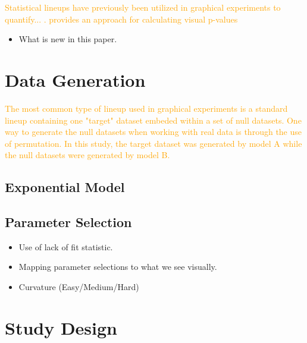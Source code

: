\documentclass[]{interact}
\theoremstyle{plain}%
\theoremstyle{definition}
\theoremstyle{remark}
\def\tightlist{}
\begin{document}
\textcolor{Orange}{Statistical lineups have previously been utilized in graphical experiments to quantify... \citep{buja_statistical_2009, wickham2010graphical, hofmann_graphical_2012, majumder_validation_2013, vanderplas_clusters_2017}.
\cite{vanderplas_statistical_nodate} provides an approach for calculating visual p-values
}

\begin{itemize}
\tightlist
\item
  What is new in this paper.
\end{itemize}

\hypertarget{data-generation}{%
\section{Data Generation}\label{data-generation}}

\textcolor{Orange}{
The most common type of lineup used in graphical experiments is a standard lineup containing one "target" dataset embeded within a set of null datasets. 
One way to generate the null datasets when working with real data is through the use of permutation. In this study, the target dataset was generated by model A while the null datasets were generated by model B.
}

\hypertarget{exponential-model}{%
\subsection{Exponential Model}\label{exponential-model}}

\textcolor{Orange}{}

\hypertarget{parameter-selection}{%
\subsection{Parameter Selection}\label{parameter-selection}}

\begin{itemize}
\tightlist
\item
  Use of lack of fit statistic.
\item
  Mapping parameter selections to what we see visually.
\item
  Curvature (Easy/Medium/Hard)
\end{itemize}

\hypertarget{study-design}{%
\section{Study Design}\label{study-design}}
\end{document}
